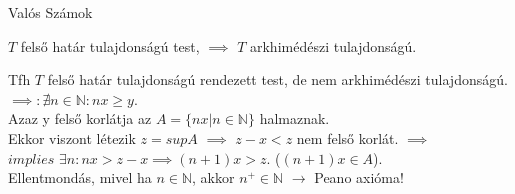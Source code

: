 \documentclass{beamer}
\begin{document}
\begin{frame}
\begin{tcolorbox}[title={Def.: Egész számok}]
\end{tcolorbox}

\begin{tcolorbox}[title={Ész}]
\end{tcolorbox}

\begin{tcolorbox}[title={Def.: Racionális számok}]
\end{tcolorbox}

\begin{tcolorbox}[title={Ész}]
\end{tcolorbox}
\end{frame}

\begin{frame}
\begin{tcolorbox}
{\Huge Valós Számok}
\end{tcolorbox}
\end{frame}

\begin{frame}
\begin{tcolorbox}[title={Def.: Rendezett test}]
\end{tcolorbox}

\begin{tcolorbox}[title={Def.: Arkhimédészi tulajdonság}]
\end{tcolorbox}

\begin{tcolorbox}[title={Def.: Felső határ tulajdonság}]
\end{tcolorbox}
\end{frame}

\begin{frame}
\begin{tcolorbox}[title={Tétel: Felső határ és arkhimédészi tulajdonság}]
$T$ felső határ tulajdonságú test, $\implies$ $T$ arkhimédészi tulajdonságú.
\end{tcolorbox}

\begin{tcolorbox}[title={Bizonyítás (Indirekt)}]
Tfh $T$ felső határ tulajdonságú rendezett test, de nem arkhimédészi tulajdonságú.\\
$\implies : {\nexists}n \in \mathbb{N} : nx \geq y$.\\
Azaz y felső korlátja az $A = \{ nx | n \in \mathbb{N} \}$ halmaznak.\\
Ekkor viszont létezik $z = sup A$ $\implies$ $z - x < z$ nem felső korlát. $\implies$\\
$implies$ ${\exists}n : nx > z - x \implies (n + 1)x > z$. ($(n + 1)x \in A$).\\
Ellentmondás, mivel ha $n \in \mathbb{N}$, akkor $n^+ \in \mathbb{N}$ $\rightarrow$ Peano axióma!
\end{tcolorbox}
\end{frame}
\end{document}
